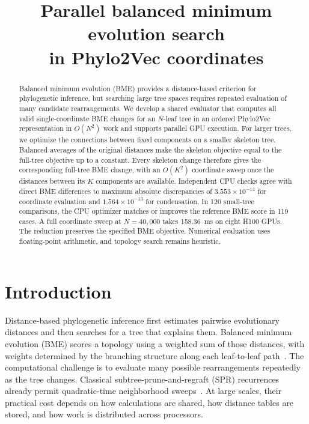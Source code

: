 \documentclass[11pt,a4paper]{article}
\title{Parallel balanced minimum evolution search\\in Phylo2Vec coordinates}
\author{}
\date{}
\makeatletter
\DeclareRobustCommand{\_}{\ifmmode\nfss@text{\textunderscore}\else\textunderscore\allowbreak\fi}
\theoremstyle{definition}
\makeatother
\begin{document}
\maketitle

\begin{abstract}
Balanced minimum evolution (BME) provides a distance-based criterion for phylogenetic inference, but searching large tree spaces requires repeated evaluation of many candidate rearrangements.
We develop a shared evaluator that computes all valid single-coordinate BME changes for an $N$-leaf tree in an ordered Phylo2Vec representation in $O(N^2)$ work and supports parallel GPU execution.
For larger trees, we optimize the connections between fixed components on a smaller skeleton tree.
Balanced averages of the original distances make the skeleton objective equal to the full-tree objective up to a constant.
Every skeleton change therefore gives the corresponding full-tree BME change, with an $O(K^2)$ coordinate sweep once the distances between its $K$ components are available.
Independent CPU checks agree with direct BME differences to maximum absolute discrepancies of $3.553\times10^{-14}$ for coordinate evaluation and $1.564\times10^{-13}$ for condensation.
In 120 small-tree comparisons, the CPU optimizer matches or improves the reference BME score in 119 cases.
A full coordinate sweep at $N=40{,}000$ takes 158.36~ms on eight H100 GPUs.
The reduction preserves the specified BME objective. Numerical evaluation uses floating-point arithmetic, and topology search remains heuristic.
\end{abstract}

\section{Introduction}
\label{sec:introduction}

Distance-based phylogenetic inference first estimates pairwise evolutionary distances and then searches for a tree that explains them.
Balanced minimum evolution (BME) scores a topology using a weighted sum of those distances, with weights determined by the branching structure along each leaf-to-leaf path~\cite{pauplin2000direct,desper2002fast,desper2004theory}.
The computational challenge is to evaluate many possible rearrangements repeatedly as the tree changes.
Classical subtree-prune-and-regraft (SPR) recurrences already permit quadratic-time neighborhood sweeps~\cite{hordijk2005spr,lefort2015fastme}.
At large scales, their practical cost depends on how calculations are shared, how distance tables are stored, and how work is distributed across processors.
\end{document}
